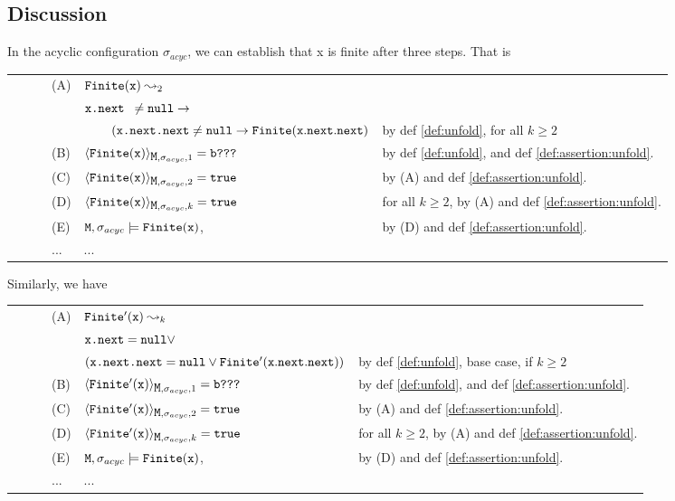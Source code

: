 \documentclass[acmsmall,screen]{acmart}
\begin{document}
\subsection{Discussion}


\begin{example}
In the acyclic configuration $\sigma_{acyc}$, we can establish that x is finite after three steps. That is\\


\begin{tabular}{llll}
\ \ \ \ & (A) & ${\mbox{\tt{Finite}}}({\mbox{\tt{x}}}) \leadsto_2 $\\
& & ${\mbox{\tt{x.next }}}\neq{\mbox{\tt{null}}} \rightarrow $\\
& & $~ ~ \hspace{.2in}( {\mbox{\tt{x.next.next}}}\neq{\mbox{\tt{null}}} \rightarrow {\mbox{\tt{Finite}}}({\mbox{\tt{x}}}.{\mbox{\tt{next}}}.{\mbox{\tt{next}}})$
 & by def \ref{def:unfold}, for all $k\geq 2$ \\
 \ \ \ \ & (B) & ${\langle{ {{\mbox{\tt{Finite}}}({\mbox{\tt{x}}})}}\rangle_{{\mbox{\tt{M}}},\sigma_{acyc} ,1}} ={\mbox{\tt{b???}}} $ & by def \ref{def:unfold}, and  def \ref{def:assertion:unfold}.\\
\ \ \ \ & (C) & ${\langle{ {{\mbox{\tt{Finite}}}({\mbox{\tt{x}}})}}\rangle_{{\mbox{\tt{M}}},\sigma_{acyc} ,2}} ={\mbox{\tt{true}}} $ & by (A) and def \ref{def:assertion:unfold}.\\
\ \ \ \ & (D) & ${\langle{ {{\mbox{\tt{Finite}}}({\mbox{\tt{x}}})}}\rangle_{{\mbox{\tt{M}}},\sigma_{acyc} ,k}}  ={\mbox{\tt{true}}}  $ & for all $k\geq 2$, by (A) and def \ref{def:assertion:unfold}.\\
 & (E) & ${\mbox{\tt{M}}},\sigma_{acyc} \models {\mbox{\tt{Finite}}}({\mbox{\tt{x}}})  $,& by (D) and def \ref{def:assertion:unfold}.\\
& ... & ...
\end{tabular}

Similarly, we have

\begin{tabular}{llll}
\ \ \ \ & (A) & ${\mbox{\tt{Finite}}}'({\mbox{\tt{x}}}) \leadsto_k$ \\
& & ${\mbox{\tt{x.next}}}={\mbox{\tt{null}}} \vee $\\
& &  $({\mbox{\tt{x.next.next}}}={\mbox{\tt{null}}} \vee {\mbox{\tt{Finite}}}'({\mbox{\tt{x}}}.{\mbox{\tt{next}}}.{\mbox{\tt{next}}}) )$ & by def \ref{def:unfold}, base case, if $k\geq 2$ \\
 \ \ \ \ & (B) & ${\langle{ {{\mbox{\tt{Finite}}}'({\mbox{\tt{x}}})}}\rangle_{{\mbox{\tt{M}}},\sigma_{acyc} ,1}} ={\mbox{\tt{b???}}} $ &by def \ref{def:unfold}, and  def \ref{def:assertion:unfold}.\\
\ \ \ \ & (C) & ${\langle{ {{\mbox{\tt{Finite}}}'({\mbox{\tt{x}}})}}\rangle_{{\mbox{\tt{M}}},\sigma_{acyc} ,2}} ={\mbox{\tt{true}}} $ & by (A) and def \ref{def:assertion:unfold}.\\
\ \ \ \ & (D) & ${\langle{ {{\mbox{\tt{Finite}}}'({\mbox{\tt{x}}})}}\rangle_{{\mbox{\tt{M}}},\sigma_{acyc} ,k}}  ={\mbox{\tt{true}}}  $ & for all $k\geq 2$, by (A) and def \ref{def:assertion:unfold}.\\
 & (E) & ${\mbox{\tt{M}}},\sigma_{acyc} \models {\mbox{\tt{Finite}}}({\mbox{\tt{x}}})  $,& by (D) and def \ref{def:assertion:unfold}.\\
& ... & ...
\end{tabular}

\end{example}
  
\end{document}
